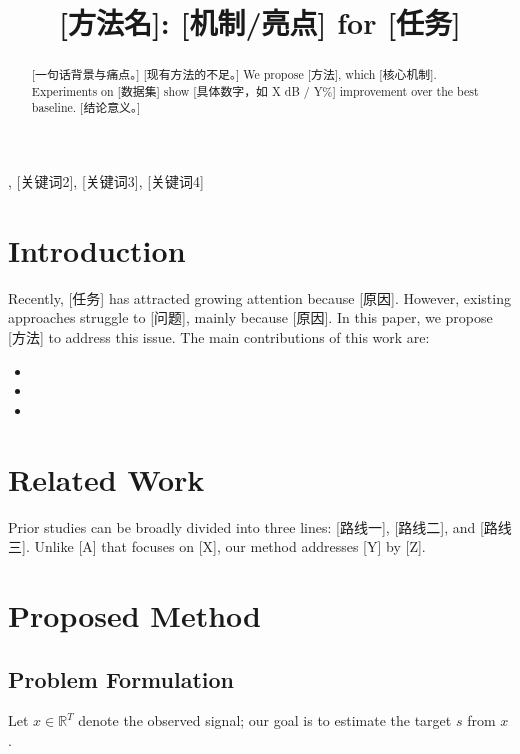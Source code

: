 \documentclass{article}
\title{[方法名]: [机制/亮点] for [任务]}
\begin{document}
\maketitle

\begin{abstract}
[一句话背景与痛点。] [现有方法的不足。] We propose [方法],
which [核心机制]. Experiments on [数据集] show [具体数字，如 X dB / Y\%]
improvement over the best baseline. [结论意义。]
\end{abstract}

\begin{keywords}
[关键词1], [关键词2], [关键词3], [关键词4]
\end{keywords}

\section{Introduction}
\label{sec:intro}
Recently, [任务] has attracted growing attention because [原因].
However, existing approaches struggle to [问题], mainly because [原因].
In this paper, we propose [方法] to address this issue.
The main contributions of this work are:
\begin{itemize}
  \item [贡献一：做了什么 + 带来什么]
  \item [贡献二]
  \item [贡献三]
\end{itemize}

\section{Related Work}
\label{sec:related}
Prior studies can be broadly divided into three lines: [路线一], [路线二],
and [路线三]. Unlike [A] that focuses on [X], our method addresses [Y] by [Z].

\section{Proposed Method}
\label{sec:method}
\subsection{Problem Formulation}
Let $x \in \mathbb{R}^{T}$ denote the observed signal; our goal is to
estimate the target $s$ from $x$.
\end{document}
